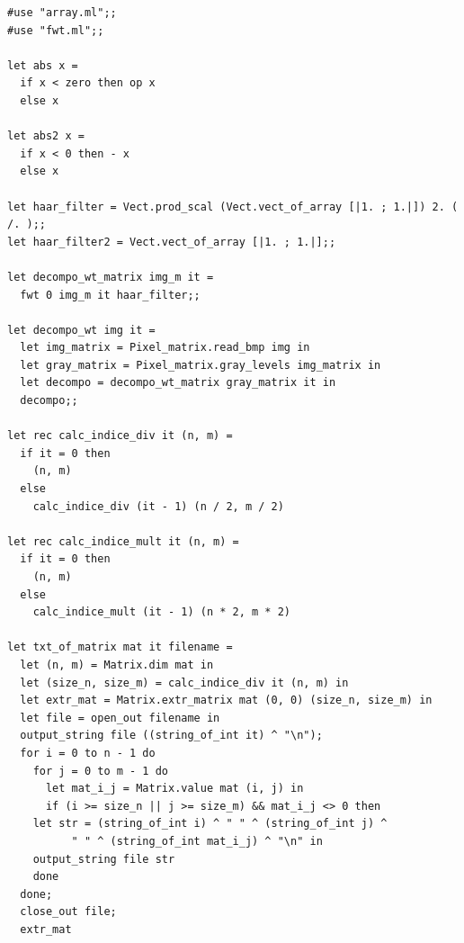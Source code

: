 \documentclass[a4paper,10pt]{report}
\theoremstyle{break}
\begin{document}
    \begin{lstlisting}
#use "array.ml";;
#use "fwt.ml";;

let abs x =
  if x < zero then op x
  else x

let abs2 x =
  if x < 0 then - x
  else x

let haar_filter = Vect.prod_scal (Vect.vect_of_array [|1. ; 1.|]) 2. ( /. );;
let haar_filter2 = Vect.vect_of_array [|1. ; 1.|];;

let decompo_wt_matrix img_m it =
  fwt 0 img_m it haar_filter;;

let decompo_wt img it =
  let img_matrix = Pixel_matrix.read_bmp img in
  let gray_matrix = Pixel_matrix.gray_levels img_matrix in
  let decompo = decompo_wt_matrix gray_matrix it in
  decompo;;
		
let rec calc_indice_div it (n, m) =
  if it = 0 then
    (n, m)
  else
    calc_indice_div (it - 1) (n / 2, m / 2)

let rec calc_indice_mult it (n, m) =
  if it = 0 then
    (n, m)
  else
    calc_indice_mult (it - 1) (n * 2, m * 2)

let txt_of_matrix mat it filename =
  let (n, m) = Matrix.dim mat in
  let (size_n, size_m) = calc_indice_div it (n, m) in
  let extr_mat = Matrix.extr_matrix mat (0, 0) (size_n, size_m) in
  let file = open_out filename in
  output_string file ((string_of_int it) ^ "\n");
  for i = 0 to n - 1 do
    for j = 0 to m - 1 do
      let mat_i_j = Matrix.value mat (i, j) in
      if (i >= size_n || j >= size_m) && mat_i_j <> 0 then
	let str = (string_of_int i) ^ " " ^ (string_of_int j) ^ 
		  " " ^ (string_of_int mat_i_j) ^ "\n" in
	output_string file str
    done
  done;
  close_out file;
  extr_mat
	
    \end{lstlisting}
\newpage
\end{document}
